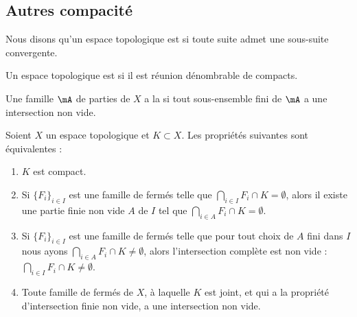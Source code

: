 \subsection{Autres compacité}

\begin{definition}        \label{DEFooTVDOooZbwOFK}
	Nous disons qu'un espace topologique est  si toute suite admet une sous-suite convergente.
\end{definition}

\begin{definition}      \label{DefFCGBooLpnSAK}
	Un espace topologique est  si il est réunion dénombrable de compacts.
\end{definition}

\begin{definition}
	Une famille \( \mA\) de parties de \( X\) a la  si tout sous-ensemble fini de \( \mA\) a une intersection non vide.
\end{definition}

\begin{proposition}\label{PropXKUMiCj}
	Soient \( X\) un espace topologique et \( K\subset X\). Les propriétés suivantes sont équivalentes :
	\begin{enumerate}
		\item\label{ItemXYmGHFai}
		      \( K\) est compact.
		\item\label{ItemXYmGHFaii}
		      Si \( \{ F_i \}_{i\in I}\) est une famille de fermés telle que \( \bigcap_{i\in I}F_i \cap K =\emptyset\), alors il existe une partie finie non vide \( A\) de \( I\) tel que \( \bigcap_{i\in A}F_i \cap K =\emptyset\).
		\item\label{ItemXYmGHFaiii}
		      Si \( \{ F_i \}_{i\in I}\) est une famille de fermés telle que pour tout choix de \( A\) fini dans \( I\) nous ayons \( \bigcap_{i\in A}F_i \cap K \neq\emptyset\), alors l'intersection complète est non vide : \( \bigcap_{i\in I}F_i \cap K\neq\emptyset\).
		\item\label{ItemXYmGHFaiv}
		      Toute famille de fermés de \( X \), à laquelle \( K \) est joint, et qui a la propriété d'intersection finie non vide, a une intersection non vide.
	\end{enumerate}
\end{proposition}

